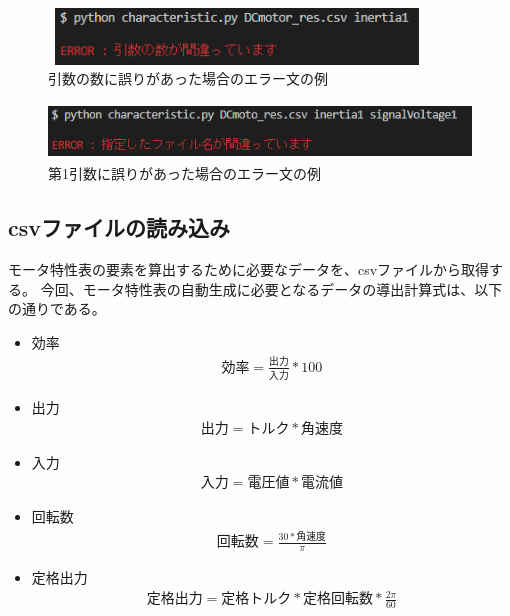 \begin{figure}[t]
	\centering
	\includegraphics[width=10cm,height=1.5cm]{./Image/error_tarinai.png}
	\caption{引数の数に誤りがあった場合のエラー文の例}
	\label{fig:error_hikisuu}
\end{figure}
\begin{figure}[t]
	\centering
	\includegraphics[width=12cm,height=1.5cm]{./Image/error_file.png}
	\caption{第1引数に誤りがあった場合のエラー文の例}
	\label{fig:error_file}
\end{figure}
\subsection{csvファイルの読み込み}\label{sub:csv_scan}
モータ特性表の要素を算出するために必要なデータを、csvファイルから取得する。
今回、モータ特性表の自動生成に必要となるデータの導出計算式は、以下の通りである。
\begin{itemize}
    \item 効率
    \begin{eqnarray}
         \mbox{効率} = \frac{\mbox{出力}}{\mbox{入力}}  * 100 
        \end{eqnarray}

        \item 出力 
        \begin{eqnarray}
        \mbox{出力} = \mbox{トルク} * \mbox{角速度} 
         \end{eqnarray}
         
        \item 入力  \begin{eqnarray} \mbox{入力} = \mbox{電圧値} * \mbox{電流値} 
    \end{eqnarray}
        \item 回転数  \begin{eqnarray} \mbox{回転数} = \frac{30 * \mbox{角速度}}{\pi}   
    \end{eqnarray}
        \item 定格出力  \begin{eqnarray} \mbox{定格出力} = \mbox{定格トルク} * \mbox{定格回転数} * \frac{2\pi}{60}　
     \end{eqnarray}
     
\end{itemize}



